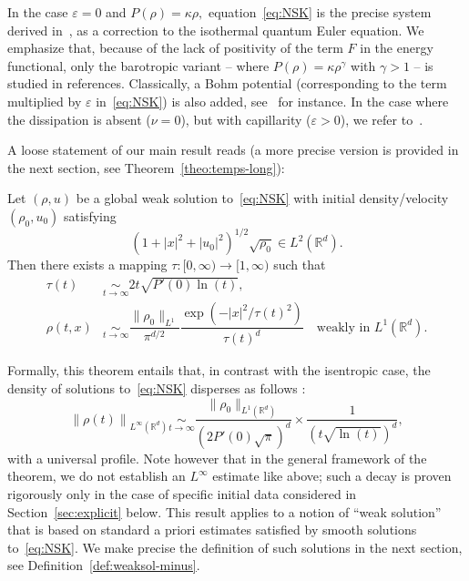 \documentclass[AHL,Unicode,longabstracts]{cedram}
\newcommand*\R{\mathbb{R}}
\newcommand*\<{\left\langle}
\renewcommand*\>{\right\rangle}
\newcommand*\Eq[2]{\mathop{\sim}\limits_{#1\rightarrow#2}}
\newcommand*\eps{\varepsilon}
\begin{document}
In the case $\varepsilon =0$ and $P(\rho)= \kappa \rho,$ equation~\eqref{eq:NSK} is the precise system derived in~\cite{Bru-Me10}, as a correction to the isothermal quantum Euler equation. We emphasize that, because of the lack of positivity of the term $F$ in the energy functional, only the barotropic variant -- where $P(\rho) = \kappa\rho^{\gamma}$ with $\gamma >1$ -- is studied in references. Classically, a Bohm potential (corresponding to the term multiplied by $\varepsilon$ in~\eqref{eq:NSK}) is also added, see~\cite{AS-comp,Gis-VV15,Jungel,VasseurYu} for instance. In the case where the dissipation is absent ($\nu=0$), but with capillarity ($\eps>0$), we refer to~\cite{BDD07,AnMa09,AnMa12,AuHa17}.

A loose statement of our main result reads (a more precise version is provided in the next section, see Theorem~\ref{theo:temps-long}):

\begin{theo}\label{thm_mainrough}
Let $(\rho,u)$ be a global weak solution to~\eqref{eq:NSK} with initial density/velocity $(\rho_0,u_0)$ satisfying
\[
(1+|x|^2 +|u_0|^2)^{1/2} \sqrt{\rho_0}\in L^2(\mathbb R^d).
\]
Then there exists a mapping $\tau : [0,\infty) \to [1,\infty)$ such that
\begin{align*}
\tau(t) &\Eq t \infty 2t \sqrt{P'(0) \ln(t)}, \\
\rho(t, x) &\Eq t \infty \dfrac{\|\rho_0\|_{L^1}}{\pi^{d/2}}
\dfrac{\exp(-|x|^2/\tau(t)^2)}{\tau(t)^{d}}\quad
\text{weakly in }L^1(\R^d).
\end{align*}
\end{theo}

Formally, this theorem entails that, in contrast with the isentropic case, the density of solutions to~\eqref{eq:NSK} disperses as follows :
\begin{equation*}
\left\| \rho(t)\right\|_{L^\infty(\R^d)}\Eq t \infty
\frac{\|\rho_0\|_{L^1(\R^d)}}{\left(2P'(0)\sqrt{\pi}\right)^d}\times
\frac{1}{\left(t\sqrt{\ln(t)}\right)^d},
\end{equation*}
with a universal profile. Note however that in the general framework of the theorem, we do not establish an $L^\infty$ estimate like above; such a decay is proven rigorously only in the case of specific initial data considered in Section~\ref{sec:explicit} below. This result applies to a notion of ``weak solution'' that is based on standard a priori estimates satisfied by smooth solutions to~\eqref{eq:NSK}. We make precise the definition of such solutions in the next section, see Definition~\ref{def:weaksol-minus}.
\end{document}
